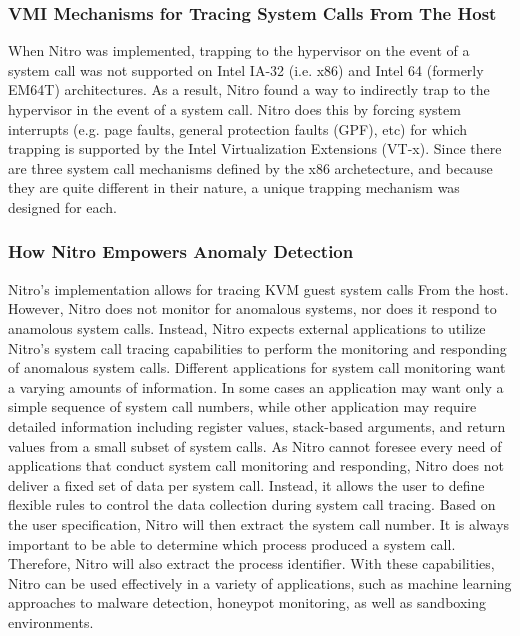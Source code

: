 \documentclass{report}
\begin{document}
\begin{spacing}{1.5}
\subsubsection{VMI Mechanisms for Tracing System Calls From The Host}

{\large
When Nitro was implemented, trapping to the hypervisor on the event of a system call was not supported on Intel IA-32 (i.e. x86) and Intel 64 (formerly EM64T) architectures. As a result, Nitro found a way to indirectly trap to the hypervisor in the event of a system call. Nitro does this by forcing system interrupts (e.g. page faults, general protection faults (GPF), etc) for which trapping is supported by the Intel Virtualization Extensions (VT-x). Since there are three system call mechanisms defined by the x86 archetecture, and because they are quite different in their nature, a unique trapping mechanism was designed for each.
\newline
}


\subsubsection{How Nitro Empowers Anomaly Detection}

{\large
Nitro's implementation allows for tracing KVM guest system calls From the host. However, Nitro does not monitor for anomalous systems, nor does it respond to anamolous system calls. Instead, Nitro expects external applications to utilize Nitro's system call tracing capabilities to perform the monitoring and responding of anomalous system calls. Different applications for system call monitoring want a varying amounts of information. In some cases an application may want only a simple sequence of system call numbers, while other application may require detailed information including register values, stack-based arguments, and return values from a small subset of system calls. As Nitro cannot foresee every need of applications that conduct system call monitoring and responding, Nitro does not deliver a fixed set of data per system call. Instead, it allows the user to define flexible rules to control the data collection during system call tracing. Based on the user specification, Nitro will then extract the system call number. It is always important to be able to determine which process produced a system call. Therefore, Nitro will also extract the process identifier. With these capabilities, Nitro can be used effectively in a variety of applications, such as machine learning approaches to malware detection, honeypot monitoring, as well as sandboxing environments.
\newline
}















\end{spacing}
\end{document}
